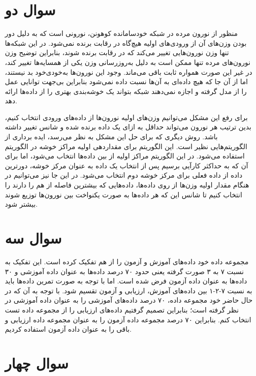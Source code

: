 \documentclass[12pt, a4paper]{article}
\begin{document}
\section*{سوال دو}

منظور از نورون مرده در شبکه خودسامانده کوهونن، نورونی است که به دلیل دور بودن وزن‌های آن از ورودی‌های اولیه
هیچ‌گاه در رقابت برنده نمی‌شود. در این شبکه‌ها تنها وزن نورون‌هایی تغییر می‌کند که در رقابت برنده شوند،
بنابراین توضیح وزن نورون‌های مرده تنها ممکن است به دلیل به‌روزرسانی وزن یکی از همسایه‌ها تغییر کند،
در غیر این صورت همواره ثابت باقی می‌ماند. وجود این نورون‌ها به‌خودی‌خود بد نیستند، اما از آن جا که هیچ
داده‌ای به آن‌ها نسبت داده نمی‌شود بنابراین بی‌جهت توانایی عمل را از مدل گرفته و اجازه نمی‌دهند شبکه بتواند یک
خوشه‌بندی بهتری را از داده‌ها ارائه دهد.

برای رفع این مشکل می‌توانیم وزن‌های اولیه نورون‌ها از داده‌های ورودی انتخاب کنیم، بدین ترتیب هر نورون می‌تواند
حداقل به ازای یک داده برنده شده و شانس تغییر داشته باشد. روش دیگری که برای حل این مشکل به نظر می‌رسد،
ایده برداری از الگوریتم‌هایی نظیر  است. این الگوریتم برای مقداردهی اولیه مراکز خوشه در الگوریتم
 استفاده می‌شود. در این الگوریتم مراکز اولیه از بین داده‌ها انتخاب می‌شود، اما برای آن که
به حداکثر کارآیی برسیم پس از انتخاب یک داده به عنوان مرکز خوشه، دورترین داده از داده فعلی برای مرکز خوشه دوم
انتخاب می‌شود. در این جا نیز می‌توانیم در هنگام مقدار اولیه وزن‌ها از روی داده‌ها، داده‌هایی که بیشترین فاصله از هم
را دارند را انتخاب کنیم تا شانس این که هر داده‌ها به صورت یکنواخت بین نورون‌ها توزیع شوند بیشتر شود.

\section*{سوال سه}

مجموعه داده  خود داده‌های آموزش و آزمون را از هم تفکیک کرده است.
این تفکیک به نسبت ۷ به ۳ صورت گرفته یعنی حدود ۷۰ درصد داده‌ها به عنوان داده آموزشی و ۳۰ داده‌ها به عنوان داده
آزمون فرض شده است. اما با توجه به صورت تمرین داده‌ها باید به نسبت ۷-۲-۱ بین داده‌های آموزش، ارزیابی و آزمون تقسیم شود.
با توجه به آن که در حال حاضر خود مجموعه داده، ۷۰ درصد داده‌های آموزشی را به عنوان داده آموزشی در نظر گرفته است؛
بنابراین تصمیم گرفتیم داده‌های ارزیابی را از مجموعه داده تست انتخاب کنم.
بنابراین ۷۰ درصد مجموعه داده آزمون را به عنوان مجموعه داده ارزیابی و باقی را به عنوان داده آزمون استفاده کردیم.

\section*{سوال چهار}
\end{document}
